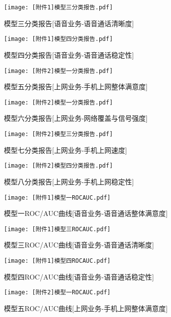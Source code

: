 \documentclass{MathorCupmodeling}
\begin{document}
	\begin{figure}[H]
		\centerline{\texttt{[image: [附件1]模型三分类报告.pdf]}}
		\caption{模型三分类报告[语音业务-语音通话清晰度]}\label{fig:ThirdModelClassificationReport}
	\end{figure}
	\begin{figure}[H]
		\centerline{\texttt{[image: [附件1]模型四分类报告.pdf]}}
		\caption{模型四分类报告[语音业务-语音通话稳定性]}\label{fig:FourthModelClassificationReport}
	\end{figure}
	\begin{figure}[H]
		\centerline{\texttt{[image: [附件2]模型一分类报告.pdf]}}
		\caption{模型五分类报告[上网业务-手机上网整体满意度]}\label{fig:FifthModelClassificationReport}
	\end{figure}
	\begin{figure}[H]
		\centerline{\texttt{[image: [附件2]模型一分类报告.pdf]}}
		\caption{模型六分类报告[上网业务-网络覆盖与信号强度]}\label{fig:SixthModelClassificationReport}
	\end{figure}
	\begin{figure}[H]
		\centerline{\texttt{[image: [附件2]模型三分类报告.pdf]}}
		\caption{模型七分类报告[上网业务-手机上网速度]}\label{fig:SeventhModelClassificationReport}
	\end{figure}
	\begin{figure}[H]
		\centerline{\texttt{[image: [附件2]模型四分类报告.pdf]}}
		\caption{模型八分类报告[上网业务-手机上网稳定性]}\label{fig:EighthModelClassificationReport}
	\end{figure}
	\begin{figure}[H]
		\centerline{\texttt{[image: [附件1]模型一ROCAUC.pdf]}}
		\caption{模型一ROC/AUC曲线[语音业务-语音通话整体满意度]}\label{fig:FirstModelROCAUC}
	\end{figure}
	\begin{figure}[H]
		\centerline{\texttt{[image: [附件1]模型三ROCAUC.pdf]}}
		\caption{模型三ROC/AUC曲线[语音业务-语音通话清晰度]}\label{fig:ThirdModelROCAUC}
	\end{figure}
	\begin{figure}[H]
		\centerline{\texttt{[image: [附件1]模型四ROCAUC.pdf]}}
		\caption{模型四ROC/AUC曲线[语音业务-语音通话稳定性]}\label{fig:FourthModelROCAUC}
	\end{figure}
	\begin{figure}[H]
		\centerline{\texttt{[image: [附件2]模型一ROCAUC.pdf]}}
		\caption{模型五ROC/AUC曲线[上网业务-手机上网整体满意度]}\label{fig:FifthModelROCAUC}
	\end{figure}
\end{document}
